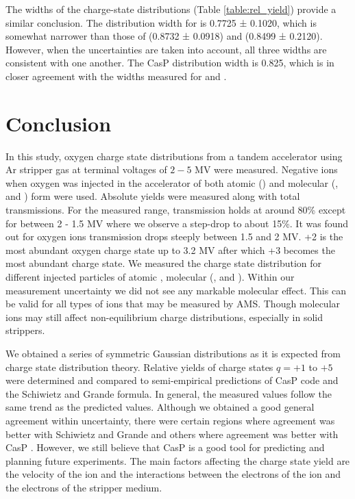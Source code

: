 \documentclass[a4paper,fleqn,review]{cas-sc}
\begin{document}
The widths of the charge-state distributions (Table \ref{table:rel_yield}) provide a similar conclusion. The distribution width for  is 0.7725 ± 0.1020, which is somewhat narrower than those of  (0.8732 ± 0.0918) and  (0.8499 ± 0.2120). However, when the uncertainties are taken into account, all three widths are consistent with one another. The CasP distribution width is 0.825, which is in closer agreement with the widths measured for  and .






\section{Conclusion}


In this study, oxygen charge state distributions from a tandem accelerator using Ar stripper gas at terminal voltages of $2-5$ MV were measured. Negative ions when oxygen was injected in the accelerator of both atomic () and molecular (, and ) form were used. Absolute yields were measured  along with total transmissions. For the measured range, transmission holds at around 80\% except for between 2 - 1.5 MV where we observe a step-drop to about 15\%.  It was found out for oxygen ions transmission drops steeply between 1.5 and 2 MV. +2 is the most abundant oxygen charge state up to 3.2 MV after which +3 becomes the most abundant charge state. We measured the charge state distribution for different injected particles of atomic , molecular (, and ). Within our measurement uncertainty we did not see any markable molecular effect. This can be valid for all types of ions that may be measured by AMS. Though molecular ions may still affect non-equilibrium charge distributions, especially in solid strippers. 


We obtained a series of symmetric Gaussian distributions as it is expected from charge state distribution theory. Relative yields of charge states $q=+1$ to $+5$ were determined and compared to semi-empirical predictions of CasP code and the Schiwietz and Grande formula. In general, the measured values follow the same trend as the predicted values. Although we obtained a good general agreement within uncertainty, there were certain regions where agreement was better with Schiwietz and Grande and others where agreement was better with CasP . However, we still believe that CasP is a good tool for predicting and planning future experiments. The main factors affecting the charge state yield are the velocity of the ion and the interactions between the electrons of the ion and the electrons of the stripper medium.
\end{document}
